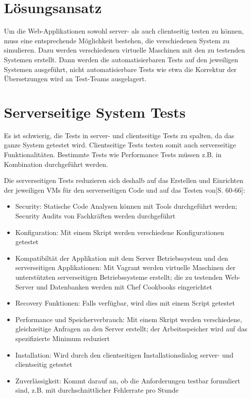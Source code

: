 \documentclass[a4paper,bibtotoc,oneside]{scrbook}
\begin{document}
\section{Lösungsansatz}
Um die Web-Applikationen sowohl server- als auch clientseitig testen zu können, muss eine entsprechende Möglichkeit bestehen, die verschiedenen System zu simulieren. Dazu werden verschiedenen virtuelle Maschinen mit den zu testenden Systemen erstellt. Dann werden die automatisierbaren Tests auf den jeweiligen Systemen ausgeführt, nicht automatisierbare Tests wie etwa die Korrektur der Übersetzungen wird an Test-Teams ausgelagert.

\section{Serverseitige System Tests}
Es ist schwierig, die Tests in server- und clientseitige Tests zu spalten, da das ganze System getestet wird. Clientseitige Tests testen somit auch serverseitige Funktionalitäten. Bestimmte Tests wie Performance Tests müssen z.B. in Kombination durchgeführt werden.

Die serverseitigen Tests reduzieren sich deshalb auf das Erstellen und Einrichten der jeweiligen VMs für den serverseitigen Code und auf das Testen von\cite{test_large_systems}[S. 60-66]:

\begin{itemize}
  \item Security: Statische Code Analysen können mit Tools durchgeführt werden; Security Audits von Fachkräften werden durchgeführt
  \item Konfiguration: Mit einem Skript werden verschiedene Konfigurationen getestet
  \item Kompatibiltät der Applikation mit dem Server Betriebssystem und den serverseitigen Applikationen: Mit Vagrant werden virtuelle Maschinen der unterstützten serverseitigen Betriebssysteme erstellt; die zu testenden Web-Server und Datenbanken werden mit Chef Cookbooks eingerichtet
  \item Recovery Funktionen: Falls verfügbar, wird dies mit einem Script getestet
  \item Performance und Speicherverbrauch: Mit einem Skript werden verschiedene, gleichzeitige Anfragen an den Server erstellt; der Arbeitsspeicher wird auf das spezifizierte Minimum reduziert
  \item Installation: Wird durch den clientseitigen Installationsdialog server- und clientseitig getestet
  \item Zuverlässigkeit: Kommt darauf an, ob die Anforderungen testbar formuliert sind, z.B. mit durchschnittlicher Fehlerrate pro Stunde
\end{itemize}
\end{document}
